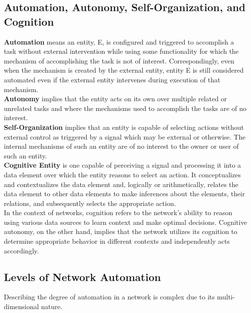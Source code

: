 \subsection{Automation, Autonomy, Self-Organization, and Cognition}
\textbf{Automation} means an entity, E, is configured and triggered to accomplish a task without external intervention while using some functionality for which the mechanism of accomplishing the task is not of interest. Correspondingly, even when the mechanism is created by the external entity, entity E is still considered automated even if the external entity intervenes during execution of that mechanism.\\
\textbf{Autonomy} implies that the entity acts on its own over multiple related or unrelated tasks and where the mechanisms used to accomplish the tasks are of no interest.\\
\textbf{Self-Organization} implies that an entity is capable of selecting actions without external control as triggered by a signal which may be external or otherwise. The internal mechanisms of such an entity are of no interest to the owner or user of such an entity.\\
\textbf{Cognitive Entity} is one capable of perceiving a signal and processing it into a data element over which the entity reasons to select an action. It conceptualizes and contextualizes the data element and, logically or arithmetically, relates the data element to other data elements to make inferences about the elements, their relations, and subsequently selects the appropriate action.\\

In the context of networks, cognition refers to the network's ability to reason using various data sources to learn context and make optimal decisions. Cognitive autonomy, on the other hand, implies that the network utilizes its cognition to determine appropriate behavior in different contexts and independently acts accordingly.
\subsection{Levels of Network Automation}
Describing the degree of automation in a network is complex due to its multi-dimensional nature.

